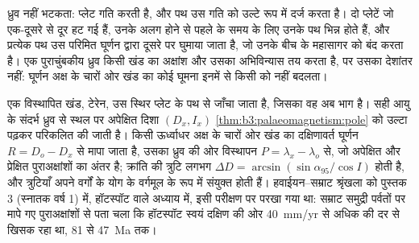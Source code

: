 ध्रुव नहीं भटकता: प्लेट गति करती है, और पथ उस गति को
उल्टे रूप में दर्ज करता है। दो प्लेटें जो एक-दूसरे से दूर हट गई हैं, उनके
अलग होने से पहले के समय के लिए उनके पथ भिन्न होते हैं, और प्रत्येक पथ उस परिमित घूर्णन द्वारा दूसरे पर घुमाया जाता है,
जो उनके बीच के महासागर को बंद करता है। एक पुराचुंबकीय ध्रुव किसी खंड का अक्षांश और उसका अभिविन्यास तय करता है,
पर उसका देशांतर नहीं: घूर्णन अक्ष के चारों ओर खंड का कोई घूमना
इनमें से किसी को नहीं बदलता।

एक विस्थापित खंड, टेरेन, उस स्थिर प्लेट के पथ से जाँचा जाता है,
जिसका वह अब भाग है। सही आयु के संदर्भ ध्रुव से स्थल पर अपेक्षित दिशा
$(D_x, I_x)$ \cref{thm:b3:palaeomagnetism:pole} को उल्टा पढ़कर परिकलित की जाती है।
किसी ऊर्ध्वाधर अक्ष के चारों ओर खंड का दक्षिणावर्त घूर्णन
$R = D_o - D_x$ से मापा जाता है, उसका ध्रुव की ओर विस्थापन $P = \lambda_x -
\lambda_o$ से, जो अपेक्षित और प्रेक्षित पुराअक्षांशों का अंतर है; क्रांति की
त्रुटि लगभग $\Delta D = \arcsin(\sin\alpha_{95}/\cos I)$ होती है, और त्रुटियाँ
अपने वर्गों के योग के वर्गमूल के रूप में संयुक्त होती हैं। हवाईयन--सम्राट श्रृंखला को
पुस्तक 3 (स्नातक वर्ष 1) में, हॉटस्पॉट वाले अध्याय में, इसी परीक्षण पर परखा गया था:
सम्राट समुद्री पर्वतों पर मापे गए पुराअक्षांशों से पता चला कि हॉटस्पॉट स्वयं दक्षिण की ओर
\qty{40}{mm/yr} से अधिक की दर से खिसक रहा था, 81 से \qty{47}{Ma} तक।

